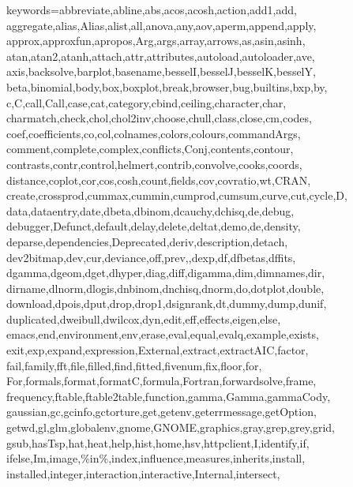 \def\zz{\ifx\[$\else\aftergroup\zzz\fi}
  \def\zzz{\setbox0\lastbox
    \dimen0\dimexpr\extrarowheight + \ht0-\dp0\relax
    \setbox0\hbox{\raise-.5\dimen0\box0}%
    \ht0=\dimexpr\ht0+\extrarowheight\relax
    \dp0=\dimexpr\dp0+\extrarowheight\relax
    \box0
  }

  {keywords={abbreviate,abline,abs,acos,acosh,action,add1,add,%
      aggregate,alias,Alias,alist,all,anova,any,aov,aperm,append,apply,%
      approx,approxfun,apropos,Arg,args,array,arrows,as,asin,asinh,%
      atan,atan2,atanh,attach,attr,attributes,autoload,autoloader,ave,%
      axis,backsolve,barplot,basename,besselI,besselJ,besselK,besselY,%
      beta,binomial,body,box,boxplot,break,browser,bug,builtins,bxp,by,%
      c,C,call,Call,case,cat,category,cbind,ceiling,character,char,%
      charmatch,check,chol,chol2inv,choose,chull,class,close,cm,codes,%
      coef,coefficients,co,col,colnames,colors,colours,commandArgs,%
      comment,complete,complex,conflicts,Conj,contents,contour,%
      contrasts,contr,control,helmert,contrib,convolve,cooks,coords,%
      distance,coplot,cor,cos,cosh,count,fields,cov,covratio,wt,CRAN,%
      create,crossprod,cummax,cummin,cumprod,cumsum,curve,cut,cycle,D,%
      data,dataentry,date,dbeta,dbinom,dcauchy,dchisq,de,debug,%
      debugger,Defunct,default,delay,delete,deltat,demo,de,density,%
      deparse,dependencies,Deprecated,deriv,description,detach,%
      dev2bitmap,dev,cur,deviance,off,prev,,dexp,df,dfbetas,dffits,%
      dgamma,dgeom,dget,dhyper,diag,diff,digamma,dim,dimnames,dir,%
      dirname,dlnorm,dlogis,dnbinom,dnchisq,dnorm,do,dotplot,double,%
      download,dpois,dput,drop,drop1,dsignrank,dt,dummy,dump,dunif,%
      duplicated,dweibull,dwilcox,dyn,edit,eff,effects,eigen,else,%
      emacs,end,environment,env,erase,eval,equal,evalq,example,exists,%
      exit,exp,expand,expression,External,extract,extractAIC,factor,%
      fail,family,fft,file,filled,find,fitted,fivenum,fix,floor,for,%
      For,formals,format,formatC,formula,Fortran,forwardsolve,frame,%
      frequency,ftable,ftable2table,function,gamma,Gamma,gammaCody,%
      gaussian,gc,gcinfo,gctorture,get,getenv,geterrmessage,getOption,%
      getwd,gl,glm,globalenv,gnome,GNOME,graphics,gray,grep,grey,grid,%
      gsub,hasTsp,hat,heat,help,hist,home,hsv,httpclient,I,identify,if,%
      ifelse,Im,image,\%in\%,index,influence,measures,inherits,install,%
      installed,integer,interaction,interactive,Internal,intersect,%
}}
